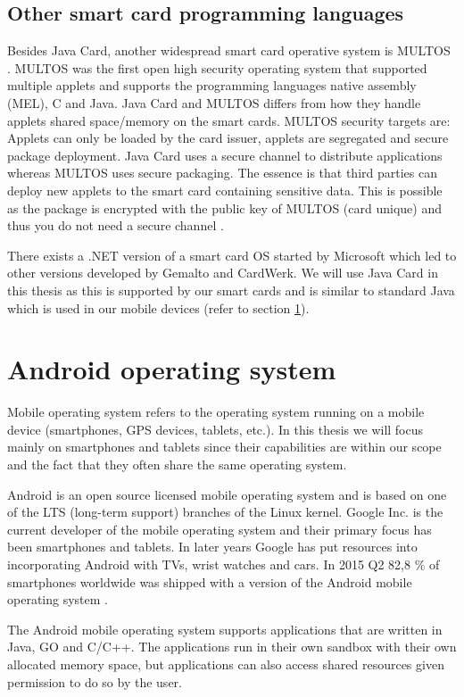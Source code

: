 \subsection{Other smart card programming languages}
Besides Java Card, another widespread smart card operative system is MULTOS \cite{multos}. MULTOS was the first open high security operating system that supported multiple applets and supports the programming languages native assembly (MEL), C and Java. Java Card and MULTOS differs from how they handle applets shared space/memory on the smart cards. MULTOS security targets are: Applets can only be loaded by the card issuer, applets are segregated and secure package deployment. Java Card uses a secure channel to distribute applications whereas MULTOS uses secure packaging. The essence is that third parties can deploy new applets to the smart card containing sensitive data. This is possible as the package is encrypted with the public key of MULTOS (card unique) and thus you do not need a secure channel \cite{smartcardThesis, multosVSjavacard}.

There exists a .NET version of a smart card OS started by Microsoft which led to other versions developed by Gemalto and CardWerk. We will use Java Card in this thesis as this is supported by our smart cards and is similar to standard Java which is used in our mobile devices (refer to section \ref{sec:androidOS}).

\section{Android operating system}
\label{sec:androidOS}
Mobile operating system refers to the operating system running on a mobile device (smartphones, GPS devices, tablets, etc.). In this thesis we will focus mainly on smartphones and tablets since their capabilities are within our scope and the fact that they often share the same operating system.

Android is an open source licensed mobile operating system and is based on one of the LTS (long-term support) branches of the Linux kernel. Google Inc. \cite{google} is the current developer of the mobile operating system and their primary focus has been smartphones and tablets. In later years Google has put resources into incorporating Android with TVs, wrist watches and cars. In 2015 Q2 82,8 \% of smartphones worldwide was shipped with a version of the Android mobile operating system \cite{androidMarketShare}.

The Android mobile operating system supports applications that are written in Java, GO and C/C++. The applications run in their own sandbox with their own allocated memory space, but applications can also access shared resources given permission to do so by the user.

